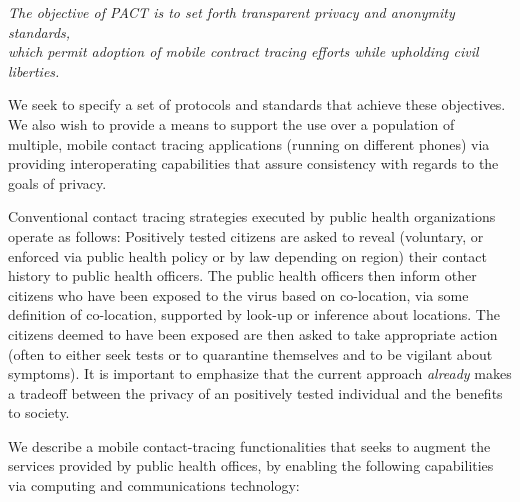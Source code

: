 \documentclass{article}
\begin{document}
\begin{center}
\emph{The objective of PACT is to set forth transparent privacy and
  anonymity standards,\\
  which permit adoption of mobile contract tracing efforts while upholding civil liberties.}
\end{center}

We seek to specify a set of protocols and standards that achieve
these objectives. We also wish to provide a means to support the use over a population of multiple, mobile contact tracing applications (running on different phones) via providing interoperating capabilities that assure consistency with regards to the goals of privacy. 

Conventional contact tracing strategies executed by public health organizations operate as follows: Positively tested citizens are asked to reveal (voluntary, or enforced via public health policy or by law depending on region) their contact history to public health officers. The public health officers then inform other citizens who have been exposed to the virus based on co-location, via some definition of co-location, supported by look-up or inference about locations. The citizens deemed to have been exposed are then asked to take appropriate action (often to either seek tests or to quarantine
themselves and to be vigilant about symptoms).  It is important to emphasize that the current approach \emph{already} makes a tradeoff between the privacy of an positively tested individual and the benefits to society.

We describe a mobile contact-tracing functionalities that seeks to augment the services provided by public health offices, by enabling the following capabilities via computing and communications technology:
\end{document}
